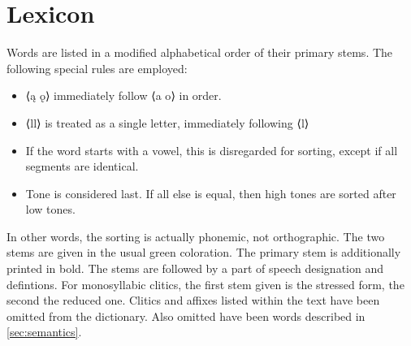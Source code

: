 \documentclass{article}
\newcommand{\orth}[1]{{\lib{}⟨}#1{\lib{}⟩}}
\begin{document}
\section{Lexicon} 
Words are listed in a modified alphabetical order of their primary stems. The following special rules are employed:
\begin{itemize}
\item \orth{ą ǫ} immediately follow \orth{a o} in order.
\item \orth{ll} is treated as a single letter, immediately following \orth{l}
\item If the word starts with a vowel, this is disregarded for sorting, except if all segments are identical.
\item Tone is considered last. If all else is equal, then high tones are sorted after low tones.
\end{itemize}

In other words, the sorting is actually phonemic, not orthographic. The two stems are given in the usual green coloration. The primary stem is additionally printed in bold. The stems are followed by a part of speech designation and defintions.  For monosyllabic clitics, the first stem given is the stressed form, the second the reduced one. Clitics and affixes listed within the text have been omitted from the dictionary. Also omitted have been words described in \ref{sec:semantics}.
\end{document}
